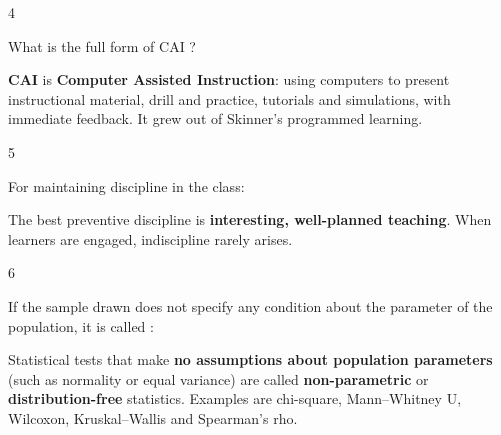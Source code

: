 \begin{question}{4}
{What is the full form of CAI ?\par}
\begin{explain}
\textbf{CAI} is \textbf{Computer Assisted Instruction}: using computers to present instructional material, drill and practice, tutorials and simulations, with immediate feedback. It grew out of Skinner's programmed learning.
\end{explain}
\end{question}

\begin{question}{5}
{For maintaining discipline in the class:\par}
\begin{explain}
The best preventive discipline is \textbf{interesting, well-planned teaching}. When learners are engaged, indiscipline rarely arises.
\end{explain}
\end{question}

\begin{question}{6}
{If the sample drawn does not specify any condition about the parameter of the population, it is called :\par}
\begin{explain}
Statistical tests that make \textbf{no assumptions about population parameters} (such as normality or equal variance) are called \textbf{non-parametric} or \textbf{distribution-free} statistics. Examples are chi-square, Mann--Whitney U, Wilcoxon, Kruskal--Wallis and Spearman's rho.
\end{explain}
\end{question}

